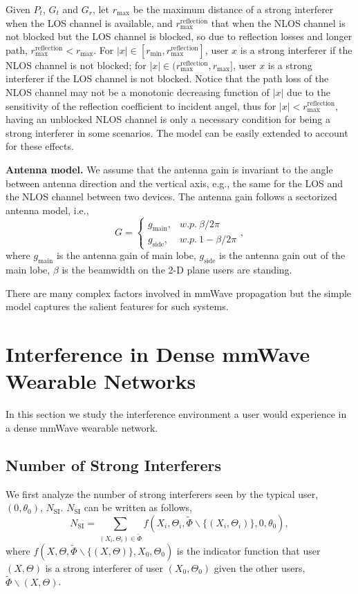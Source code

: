 \documentclass[10pt, conference, letterpaper]{IEEEtran}
\begin{document}
Given $P_t$, $G_t$ and $G_r$, let $r_{\max}$ be the maximum distance of a strong interferer when the LOS channel is available, and $r_{\max}^{\mathrm{reflection}}$ that when the NLOS channel is not blocked but the LOS channel is blocked, so due to reflection losses and longer path, $r_{\max}^{\mathrm{reflection}}<r_{\max}$.
For $|x|\in[r_{\min},r_{\max}^{\mathrm{reflection}}]$, user $x$ is a strong interferer if the NLOS channel is not blocked; for $|x|\in(r_{\max}^{\mathrm{reflection}}, r_{\max}]$, user $x$ is a strong interferer if the LOS channel is not blocked.
Notice that the path loss of the NLOS channel may not be a monotonic decreasing function of $|x|$ due to the sensitivity of the reflection coefficient to incident angel, thus for $|x|<r_{\max}^{\mathrm{reflection}}$, having an unblocked NLOS channel is only a necessary condition for being a strong interferer in some scenarios. 
The model can be easily extended to account for these effects. 


\textbf{Antenna model.} We assume that the antenna gain is invariant to the angle between antenna direction and the vertical axis, e.g., the same for the LOS and the NLOS channel between two devices. 
The antenna gain follows a sectorized antenna model, i.e., 
\begin{equation*}
G = 
\begin{cases}
g_{\mathrm{main}}, & w.p. ~ \beta/2\pi \\
g_{\mathrm{side}}, & w.p. ~ 1-\beta/2\pi
\end{cases},
\end{equation*}
where $g_{\mathrm{main}}$ is the antenna gain of main lobe, $g_{\mathrm{side}}$ is the antenna gain out of the main lobe, $\beta$ is the beamwidth on the 2-D plane users are standing.

There are many complex factors involved in mmWave propagation but the simple model captures the salient features for such systems.


\section{Interference in Dense mmWave Wearable Networks}\label{section:interference}
In this section we study the interference environment a user would experience in a dense mmWave wearable network.


\subsection{Number of Strong Interferers}\label{section:channel:number}
We first analyze the number of strong interferers seen by the typical user, $(0, \theta_0)$, $N_{\mathrm{SI}}$. 
$N_{\mathrm{SI}}$ can be written as follows, 
\begin{equation}
N_{\mathrm{SI}} = \sum_{(X_i, \Theta_i)\in \tilde{\Phi}}f(X_i, \Theta_i, \tilde{\Phi}\backslash\{(X_i,\Theta_i)\}, 0, \theta_0),
\end{equation}
where $f(X, \Theta, \tilde{\Phi}\backslash\{(X,\Theta)\}, X_0, \Theta_0)$ is the indicator function that user $(X, \Theta)$ is a strong interferer of user $(X_0,\Theta_0)$ given the other users, $\tilde{\Phi}\backslash (X,\Theta)$.
\end{document}
